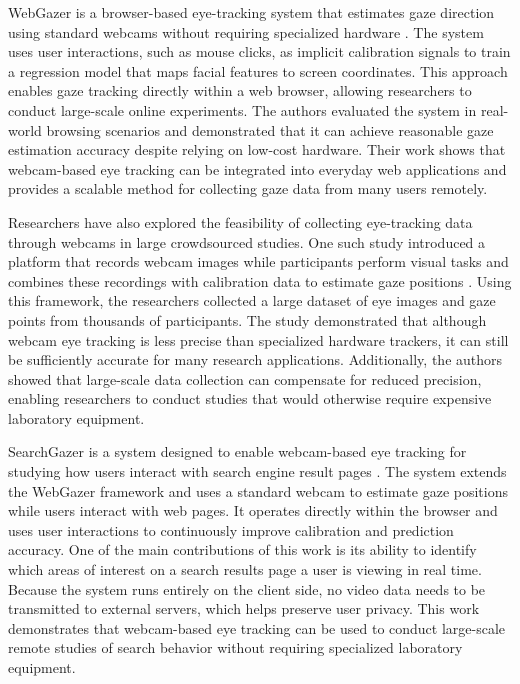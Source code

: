 \documentclass[12pt]{article}
\begin{document}
WebGazer is a browser-based eye-tracking system that estimates gaze direction using standard webcams without requiring specialized hardware \cite{papoutsaki2016webgazer}. The system uses user interactions, such as mouse clicks, as implicit calibration signals to train a regression model that maps facial features to screen coordinates. This approach enables gaze tracking directly within a web browser, allowing researchers to conduct large-scale online experiments. The authors evaluated the system in real-world browsing scenarios and demonstrated that it can achieve reasonable gaze estimation accuracy despite relying on low-cost hardware. Their work shows that webcam-based eye tracking can be integrated into everyday web applications and provides a scalable method for collecting gaze data from many users remotely.

Researchers have also explored the feasibility of collecting eye-tracking data through webcams in large crowdsourced studies. One such study introduced a platform that records webcam images while participants perform visual tasks and combines these recordings with calibration data to estimate gaze positions \cite{krafka2016eye}. Using this framework, the researchers collected a large dataset of eye images and gaze points from thousands of participants. The study demonstrated that although webcam eye tracking is less precise than specialized hardware trackers, it can still be sufficiently accurate for many research applications. Additionally, the authors showed that large-scale data collection can compensate for reduced precision, enabling researchers to conduct studies that would otherwise require expensive laboratory equipment.

SearchGazer is a system designed to enable webcam-based eye tracking for studying how users interact with search engine result pages \cite{papoutsaki2017searchgazer}. The system extends the WebGazer framework and uses a standard webcam to estimate gaze positions while users interact with web pages. It operates directly within the browser and uses user interactions to continuously improve calibration and prediction accuracy. One of the main contributions of this work is its ability to identify which areas of interest on a search results page a user is viewing in real time. Because the system runs entirely on the client side, no video data needs to be transmitted to external servers, which helps preserve user privacy. This work demonstrates that webcam-based eye tracking can be used to conduct large-scale remote studies of search behavior without requiring specialized laboratory equipment.
\end{document}
